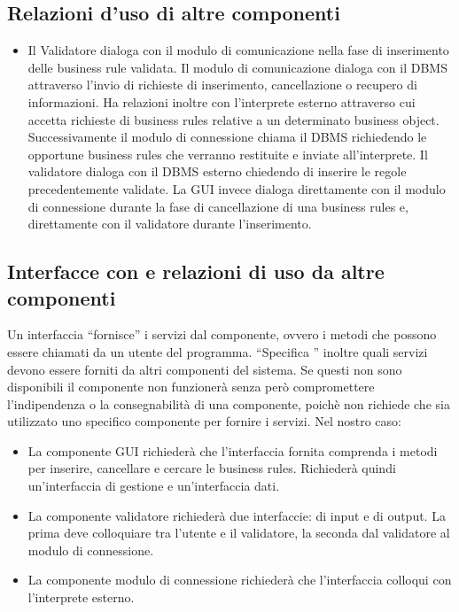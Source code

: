 \documentclass[11pt,titlepage,a4paper]{report}
\begin{document}
\subsection{Relazioni d'uso di altre componenti}
\begin{itemize}
\item{Il Validatore dialoga con il modulo di comunicazione nella fase di inserimento delle business rule validata. }
Il modulo di comunicazione dialoga con il DBMS attraverso l'invio di richieste di inserimento, cancellazione o recupero di informazioni. Ha relazioni inoltre con l'interprete esterno attraverso cui accetta richieste di business rules relative a un determinato business object. Successivamente il modulo di connessione chiama il DBMS richiedendo le opportune business rules che verranno restituite e inviate all'interprete. Il validatore dialoga con il DBMS esterno chiedendo di inserire le regole precedentemente validate. La GUI invece dialoga direttamente con il modulo di connessione durante la fase di cancellazione di una business rules e, direttamente con il validatore durante l'inserimento.
\end{itemize}
\subsection{Interfacce con e relazioni di uso da altre componenti}
Un interfaccia ``fornisce'' i servizi dal componente, ovvero i metodi che possono essere chiamati da un utente del programma. ``Specifica '' inoltre quali servizi devono essere forniti da altri componenti del sistema. Se questi non sono disponibili il componente non funzioner\`a senza per\`o compromettere l'indipendenza o la consegnabilit\`a di una componente, poich\`e non richiede che sia utilizzato uno specifico componente per fornire i servizi. Nel nostro caso:
\begin{itemize}
\item La componente GUI richieder\`a che l'interfaccia fornita comprenda i metodi per inserire, cancellare e cercare le business rules. Richieder\`a quindi un'interfaccia di gestione e un'interfaccia dati.
\item La componente validatore richieder\`a due interfaccie: di input e di output. La prima deve colloquiare tra l'utente e il validatore, la seconda dal validatore al modulo di connessione.
\item La componente modulo di connessione richieder\`a che l'interfaccia colloqui con l'interprete esterno.
\end{itemize}
\end{document}
